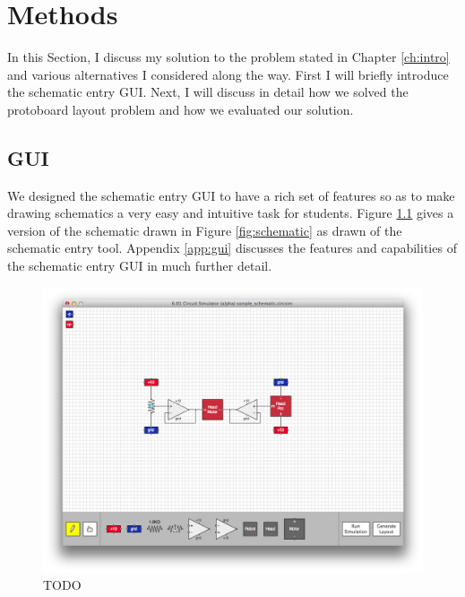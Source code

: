 
\chapter{Methods}
\label{ch:methods}

In this Section, I discuss my solution to the problem stated in Chapter
\ref{ch:intro} and various alternatives I considered along the way. First I will
briefly introduce the schematic entry GUI. Next, I will discuss in detail how
we solved the protoboard layout problem and how we evaluated our solution.

\section{GUI}

We designed the schematic entry GUI to have a rich set of features so as to make
drawing schematics a very easy and intuitive task for students.
Figure \ref{fig:gui_example} gives a version of the schematic drawn in Figure
\ref{fig:schematic} as drawn of the schematic entry tool. Appendix \ref{app:gui}
discusses the features and capabilities of the schematic entry GUI in much
further detail.

\begin{figure}
\begin{center}
\includegraphics[width=\textwidth]{Images/gui_example.png}
\caption{TODO}
\label{fig:gui_example}
\end{center}
\end{figure}


